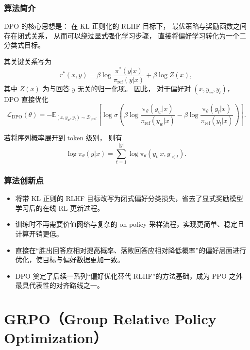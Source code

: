 \documentclass[UTF8]{ctexart}
\begin{document}
\subsubsection{算法简介}

DPO 的核心思想是：
在 KL 正则化的 RLHF 目标下，
最优策略与奖励函数之间存在闭式关系，
从而可以绕过显式强化学习步骤，
直接将偏好学习转化为一个二分类式目标。

其关键关系写为
\begin{equation}
r^*(x,y)
=
\beta \log \frac{\pi^*(y|x)}{\pi_{\mathrm{ref}}(y|x)}
+
\beta \log Z(x),
\end{equation}
其中 $Z(x)$ 为与回答 $y$ 无关的归一化项。
因此，
对于偏好对 $(x,y_w,y_l)$，
DPO 直接优化
\begin{equation}
\mathcal{L}_{\mathrm{DPO}}(\theta)
=
-
\mathbb{E}_{(x,y_w,y_l)\sim \mathcal{D}_{\mathrm{pref}}}
\left[
\log
\sigma
\left(
\beta \log \frac{\pi_\theta(y_w|x)}{\pi_{\mathrm{ref}}(y_w|x)}
-
\beta \log \frac{\pi_\theta(y_l|x)}{\pi_{\mathrm{ref}}(y_l|x)}
\right)
\right].
\end{equation}

若将序列概率展开到 token 级别，
则有
\begin{equation}
\log \pi_\theta(y|x)
=
\sum_{t=1}^{|y|}
\log \pi_\theta(y_t|x,y_{<t}).
\end{equation}

\subsubsection{算法创新点}

\begin{itemize}
    \item 将带 KL 正则的 RLHF 目标改写为闭式偏好分类损失，省去了显式奖励模型学习后的在线 RL 更新过程。
    \item 训练时不再需要价值网络与复杂的 on-policy 采样流程，实现更简单、稳定且计算开销更低。
    \item 直接在“胜出回答应相对提高概率、落败回答应相对降低概率”的偏好层面进行优化，使目标与偏好数据更加一致。
    \item DPO 奠定了后续一系列“偏好优化替代 RLHF”的方法基础，成为 PPO 之外最具代表性的对齐路线之一。
\end{itemize}


\section{GRPO（Group Relative Policy Optimization）}
\end{document}
